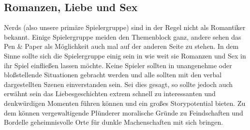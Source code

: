 \subsection*{Romanzen, Liebe und Sex}
Nerds (also unsere primäre Spielergruppe) sind in der Regel nicht als Romantiker bekannt. Einige Spielergruppe meiden den Themenblock ganz, andere sehen das Pen \& Paper als Möglichkeit auch mal auf der anderen Seite zu stehen. In dem Sinne sollte sich die Spielergruppe einig sein in wie weit sie Romanzen und Sex in ihr Spiel einfließen lassen möchte. Keine Spieler sollten in unangenehme oder bloßstellende Situationen gebracht werden und alle sollten mit den verbal dargestellten Szenen einverstanden sein. Sei dies gesagt, so sollte jedoch auch erwähnt sein das Liebesgeschichten extrem schnell zu interessanten und denkwürdigen Momenten führen können und ein großes Storypotential bieten. Zu dem können vergewaltigende Plünderer moralische Gründe zu Feindschaften und Bordelle geheimnisvolle Orte für dunkle Machenschaften mit sich bringen.